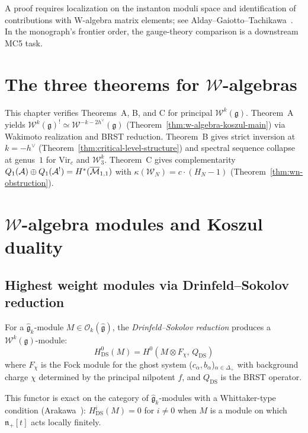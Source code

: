 \begin{remark}
A proof requires localization on the instanton moduli space and identification of contributions with W-algebra matrix elements; see Alday--Gaiotto--Tachikawa~\cite{AGT09}.  In the monograph's frontier order, the gauge-theory comparison is a downstream MC5 task.
\end{remark}


\section{The three theorems for $\mathcal{W}$-algebras}

\begin{remark}
\label{rem:w-algebra-three-theorems}
This chapter verifies Theorems~A, B, and C for principal $\mathcal{W}^k(\mathfrak{g})$.
Theorem~A yields $\mathcal{W}^k(\mathfrak{g})^! \simeq \mathcal{W}^{-k-2h^\vee}(\mathfrak{g})$ (Theorem~\ref{thm:w-algebra-koszul-main}) via Wakimoto realization and BRST reduction.
Theorem~B gives strict inversion at $k = -h^\vee$ (Theorem~\ref{thm:critical-level-structure}) and spectral sequence collapse at genus~$1$ for $\mathrm{Vir}_c$ and $\mathcal{W}_3^k$.
Theorem~C gives complementarity $Q_1(\mathcal{A}) \oplus Q_1(\mathcal{A}^!) = H^*(\overline{\mathcal{M}}_{1,1})$ with $\kappa(\mathcal{W}_N) = c \cdot (H_N - 1)$ (Theorem~\ref{thm:wn-obstruction}).
\end{remark}

\section{$\mathcal{W}$-algebra modules and Koszul duality}
\label{sec:w-algebra-modules}

\subsection{Highest weight modules via Drinfeld--Sokolov reduction}

\begin{definition}
\label{def:w-module-ds}
For a $\widehat{\mathfrak{g}}_k$-module $M \in
\mathcal{O}_k(\widehat{\mathfrak{g}})$, the
\emph{Drinfeld--Sokolov reduction} produces a
$\mathcal{W}^k(\mathfrak{g})$-module:
\[
H^0_{\mathrm{DS}}(M) = H^0(M \otimes F_{\chi},\, Q_{\mathrm{DS}})
\]
where $F_\chi$ is the Fock module for the ghost system
($c_\alpha, b_\alpha$)$_{\alpha \in \Delta_+}$ with background charge
$\chi$ determined by the principal nilpotent $f$, and
$Q_{\mathrm{DS}}$ is the BRST operator.

This functor is exact on the category of $\widehat{\mathfrak{g}}_k$-modules
with a Whittaker-type condition (Arakawa~\cite{Arakawa17}): $H^i_{\mathrm{DS}}(M)
= 0$ for $i \neq 0$ when $M$ is a module on which
$\mathfrak{n}_+[t]$ acts locally finitely.
\end{definition}

